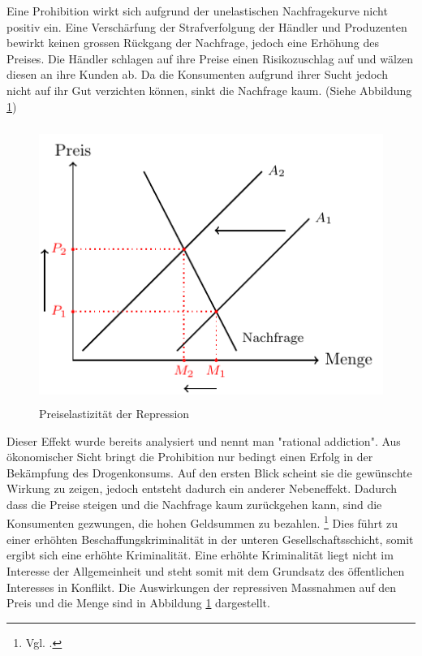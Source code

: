 \documentclass[../main.tex]{subfiles}
\begin{document}
	\noindent
	Eine Prohibition wirkt sich aufgrund der unelastischen Nachfragekurve nicht positiv ein.
	Eine Verschärfung der Strafverfolgung der Händler und Produzenten bewirkt keinen grossen Rückgang der Nachfrage, jedoch eine Erhöhung des Preises.
	Die Händler schlagen auf ihre Preise einen Risikozuschlag auf und wälzen diesen an ihre Kunden ab.
	Da die Konsumenten aufgrund ihrer Sucht jedoch nicht auf ihr Gut verzichten können, sinkt die Nachfrage kaum.
	(Siehe Abbildung \ref{fig:repression})\\
	
	\noindent
	\begin{figure}[H]
		\centering
		\includegraphics[height=9cm]{../figures/priceelasticity-repression}
		\captionsetup{font=small}
		\caption[Preiselastizität der Repression]{Preiselastizität der Repression\protect\footnotemark}		
		\label{fig:repression}
	\end{figure}
	
	\noindent
	Dieser Effekt wurde bereits analysiert und nennt man "rational addiction".
	Aus ökonomischer Sicht bringt die Prohibition nur bedingt einen Erfolg in der Bekämpfung des Drogenkonsums. 
	Auf den ersten Blick scheint sie die gewünschte Wirkung zu zeigen, jedoch entsteht dadurch ein anderer Nebeneffekt. 
	Dadurch dass die Preise steigen und die Nachfrage kaum zurückgehen kann, sind die Konsumenten gezwungen, die hohen Geldsummen zu bezahlen.%
	\footnote{Vgl. \cite{becker}.}
	Dies führt zu einer erhöhten Beschaffungskriminalität in der unteren Gesellschaftsschicht, somit ergibt sich eine erhöhte Kriminalität. 
	Eine erhöhte Kriminalität liegt nicht im Interesse der Allgemeinheit und steht somit mit dem Grundsatz des öffentlichen Interesses in Konflikt.
	Die Auswirkungen der repressiven Massnahmen auf den Preis und die Menge sind in Abbildung \ref{fig:repression} dargestellt.
	
\end{document}
